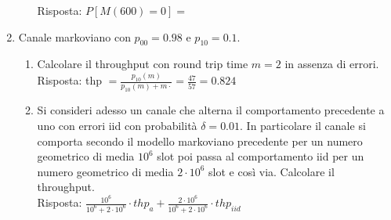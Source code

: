 \documentclass{article}
\begin{document}
\begin{enumerate}
\begin{enumerate}[label=\alph*)]
        Risposta: $P[M(600) = 0] = $
    \end{enumerate}
    
    \item Canale markoviano con $p_{00} = 0.98$ e $p_{10} = 0.1$.
    \begin{enumerate}[label=\alph*)]
        \item Calcolare il throughput con round trip time $m=2$ in assenza di errori.\\
        
        Risposta: thp $= \frac{p_{10}(m)}{p_{10}(m) + m\cdot} = \frac{47}{57} = 0.824$
        \item Si consideri adesso un canale che alterna il comportamento precedente a uno con errori iid con probabilità $\delta=0.01$.
    		In particolare il canale si comporta secondo il modello markoviano precedente per un numero geometrico di media $10^6$ slot poi passa al comportamento iid per un numero geometrico di media $2\cdot 10^6$ slot e così via.
    		Calcolare il throughput.\\
    		
    		Risposta: $\frac{10^6}{10^6+2\cdot 10^6}\cdot thp_{a} + \frac{2\cdot 10^6}{10^6+2\cdot 10^6}\cdot thp_{iid}$
    \end{enumerate}
\end{enumerate}

\newpage
\end{document}
